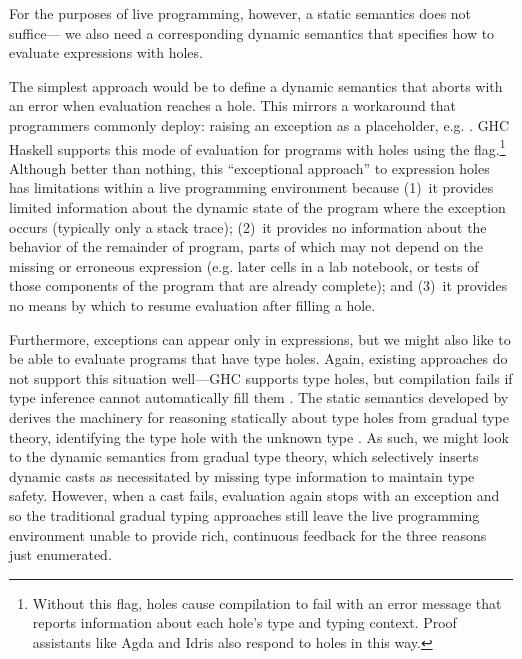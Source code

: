 %
For the purposes of live programming, however, a static semantics does not suffice---%
we also need a corresponding dynamic semantics that specifies how to evaluate expressions with holes. %
%

The simplest approach would be to define a dynamic semantics that aborts with an error when evaluation reaches a hole. 
%
This mirrors a workaround that programmers commonly deploy: 
raising an exception as a placeholder, e.g. . 
GHC Haskell supports this mode of evaluation for programs with holes using the  flag.\footnote{
Without this flag, holes cause compilation to fail with an error message that reports information about each hole's type and typing context. 
Proof assistants like Agda \cite{norell:thesis,norell2009dependently} and Idris \cite{brady2013idris} also respond to holes in this way.
} 
Although better than nothing, this ``exceptional approach'' to expression holes has limitations 
within a live programming environment because 
(1)~it provides limited information about the dynamic state of the program where the exception occurs
(typically only a stack trace);  
(2)~it provides no information about the behavior of the remainder of program, 
parts of which may not depend on the missing or erroneous expression (e.g. later cells in a lab notebook, or tests of those components of the program that are already complete); and 
(3)~it provides no means by which to resume evaluation after filling a hole.

Furthermore, exceptions can appear only in expressions, but we might also like to be able to evaluate programs that have type holes. Again, existing approaches do not support this situation well---GHC supports type holes, but compilation fails if type inference cannot automatically fill them \cite{GHCHoles}. 
The static semantics developed by \citet{popl-paper} derives the machinery for 
reasoning statically about type holes from gradual type theory, 
identifying the type hole with the unknown type \cite{DBLP:conf/snapl/SiekVCB15,Siek06a}.
%
As such, we might look to the dynamic semantics from
gradual type theory, 
which selectively inserts dynamic casts as necessitated by missing type information to maintain type safety. 
However, when a cast fails, evaluation again stops with 
an exception and so the traditional gradual typing approaches still leave the live programming environment unable to provide rich, continuous feedback for the three reasons just enumerated.

